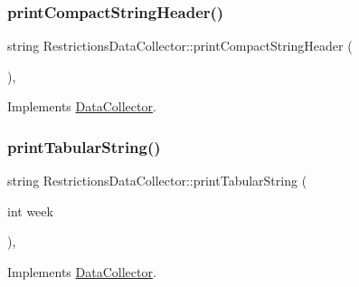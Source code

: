 \subsubsection{\texorpdfstring{print\+Compact\+String\+Header()}{printCompactStringHeader()}}
{\footnotesize\ttfamily string Restrictions\+Data\+Collector\+::print\+Compact\+String\+Header (\begin{DoxyParamCaption}{ }\end{DoxyParamCaption})\hspace{0.3cm}{\ttfamily [override]}, {\ttfamily [virtual]}}



Implements \mbox{\hyperlink{classDataCollector_a98dcb4ec871d9c7fbf7545c64e5ccc67_a98dcb4ec871d9c7fbf7545c64e5ccc67}{Data\+Collector}}.

\mbox{\label{classRestrictionsDataCollector_a45e5612e70ec98430e31271f68ca407e_a45e5612e70ec98430e31271f68ca407e}} 
\subsubsection{\texorpdfstring{print\+Tabular\+String()}{printTabularString()}}
{\footnotesize\ttfamily string Restrictions\+Data\+Collector\+::print\+Tabular\+String (\begin{DoxyParamCaption}\item[{int}]{week }\end{DoxyParamCaption})\hspace{0.3cm}{\ttfamily [override]}, {\ttfamily [virtual]}}



Implements \mbox{\hyperlink{classDataCollector_a397fccabe0223267eea8fc7cac0e59da_a397fccabe0223267eea8fc7cac0e59da}{Data\+Collector}}.

\mbox{\label{classRestrictionsDataCollector_a2676a6693b254997d223fc1c437258ab_a2676a6693b254997d223fc1c437258ab}} 
